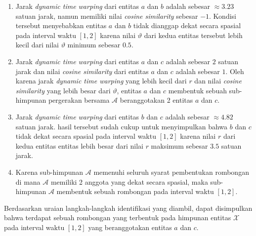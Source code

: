\begin{enumerate}
    \begin{enumerate}
        \item Jarak \textit{dynamic time warping} dari entitas $a$ dan $b$ adalah sebesar $\approx 3.23$ satuan jarak, namun memiliki nilai \textit{cosine similarity} sebesar $-1$. Kondisi tersebut menyebabkan entitas $a$ dan $b$ tidak dianggap dekat secara spasial pada interval waktu $[1, 2]$ karena nilai $\vartheta$ dari kedua entitas tersebut lebih kecil dari nilai $\vartheta$ minimum sebesar $0.5$.
        \item Jarak \textit{dynamic time warping} dari entitas $a$ dan $c$ adalah sebesar $2$ satuan jarak dan nilai \textit{cosine similarity} dari entitas $a$ dan $c$ adalah sebesar $1$. Oleh karena jarak \textit{dynamic time warping} yang lebih kecil dari $r$ dan nilai \textit{cosine similarity} yang lebih besar dari $\vartheta$, entitas $a$ dan $c$ membentuk sebuah sub-himpunan pergerakan bersama $\mathcal{A}$ beranggotakan 2 entitas $a$ dan $c$.
        \item Jarak \textit{dynamic time warping} dari entitas $b$ dan $c$ adalah sebesar $\approx 4.82$ satuan jarak. hasil tersebut sudah cukup untuk menyimpulkan bahwa $b$ dan $c$ tidak dekat secara spasial pada interval waktu $[1, 2]$ karena nilai $r$ dari kedua entitas entitas lebih besar dari nilai $r$ maksimum sebesar $3.5$ satuan jarak.
        \item Karena sub-himpunan $\mathcal{A}$ memenuhi seluruh syarat pembentukan rombongan di mana $\mathcal{A}$ memiliki 2 anggota yang dekat secara spasial, maka sub-himpunan $\mathcal{A}$ membentuk sebuah rombongan pada interval waktu $[1, 2]$.
    \end{enumerate}
\end{enumerate}

Berdasarkan uraian langkah-langkah identifikasi yang diambil, dapat disimpulkan bahwa terdapat sebuah rombongan yang terbentuk pada himpunan entitas $\mathcal{X}$ pada interval waktu $[1, 2]$ yang beranggotakan entitas $a$ dan $c$.
